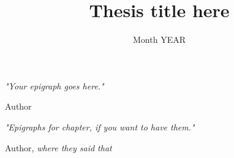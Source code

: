 \documentclass[10pt,twoside,a4paper,fleqn]{scrbook}
\title{Thesis title here}
\date{Month YEAR}
\begin{document}
\newlength{\originalVOffset}
 \newlength{\originalHOffset}
 \setlength{\originalVOffset}{\voffset}   
 \setlength{\originalHOffset}{\hoffset}
 \setlength{\voffset}{0cm}
 \setlength{\hoffset}{0cm}
 
 
 

 


 \setlength{\voffset}{\originalVOffset}
 \setlength{\hoffset}{\originalHOffset}


\maketitle 							%

\clearpage
\thispagestyle{empty}
\vspace*{\fill}


\epigraph{\itshape "Your epigraph goes here."}{Author}




\pagestyle{fancy}               	%




\clearpage %
\thispagestyle{empty}
\vspace*{\fill}
\epigraph{\itshape "Epigraphs for chapter, if you want to have them." }{Author, \textit{where they said that}}

\newpage
	

\appendix








%
\end{document}
